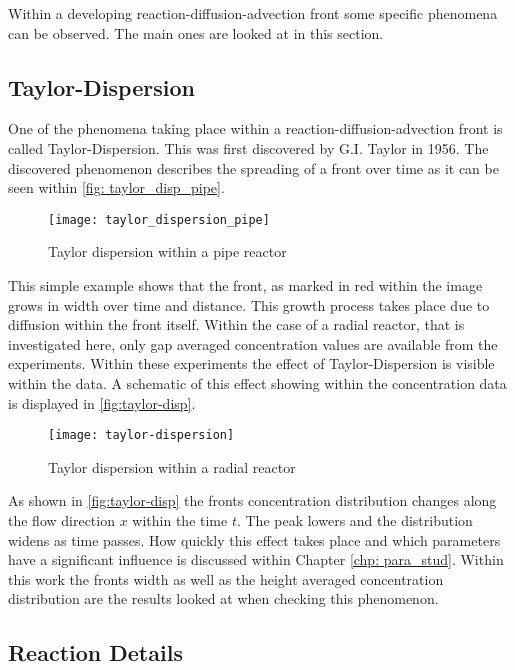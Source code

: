 \documentclass[../thesis.tex]{subfiles}
\begin{document}
Within a developing reaction-diffusion-advection front some specific phenomena can be observed. The main ones are looked at in this section.

\subsection{Taylor-Dispersion}

One of the phenomena taking place within a reaction-diffusion-advection front is called Taylor-Dispersion. This was first discovered by G.I. Taylor\cite{aris1956dispersion} in 1956. The discovered phenomenon describes the spreading of a front over time as it can be seen within \autoref{fig: taylor_disp_pipe}. 
\begin{figure}[htbp]
	\centering
	\texttt{[image: taylor\_dispersion\_pipe]}
	\caption{Taylor dispersion within a pipe reactor}
	\label{fig: taylor_disp_pipe}
\end{figure}
This simple example shows that the front, as marked in red within the image grows in width over time and distance. This growth process takes place due to diffusion within the front itself. Within the case of a radial reactor, that is investigated here, only gap averaged concentration values are available from the experiments. Within these experiments the effect of Taylor-Dispersion is visible within the data. A schematic \cite{levenspiel1998chemical} of this effect showing within the concentration data is displayed in \autoref{fig:taylor-disp}.
\begin{figure}[htbp]
	\centering
	\texttt{[image: taylor-dispersion]}
	\caption{Taylor dispersion within a radial reactor \cite{levenspiel1998chemical}}
	\label{fig:taylor-disp}
\end{figure}

As shown in \autoref{fig:taylor-disp} the fronts concentration distribution changes along the flow direction $x$ within the time $t$. The peak lowers and the distribution widens as time passes. How quickly this effect takes place and which parameters have a significant influence is discussed within Chapter \ref{chp: para_stud}. Within this work the fronts width as well as the height averaged concentration distribution are the results looked at when checking this phenomenon.

\subsection{Reaction Details}
\label{sec: reaction_details}
\end{document}
